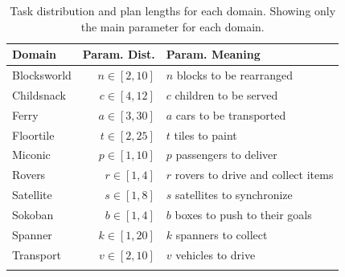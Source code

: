 \documentclass{article}
\begin{document}
\begin{table}[t!]
\centering
\begin{tabular}{lrl}
\toprule
\textbf{Domain} & \textbf{Param. Dist.} & \textbf{Param. Meaning}               \\ \midrule
Blocksworld     & $n \in [2,10]$        & $n$ blocks to be rearranged           \\
Childsnack      & $c \in [4,12]$        & $c$ children to be served             \\
Ferry           & $a \in [3,30]$        & $a$ cars to be transported            \\
Floortile       & $t \in [2,25]$        & $t$ tiles to paint                    \\
Miconic         & $p \in [1, 10]$       & $p$ passengers to deliver             \\
Rovers          & $r \in [1,4]$         & $r$ rovers to drive and collect items \\
Satellite       & $s \in [1,8]$         & $s$ satellites to synchronize         \\
Sokoban         & $b \in [1,4]$         & $b$ boxes to push to their goals      \\
Spanner         & $k \in [1,20]$        & $k$ spanners to collect               \\
Transport       & $v \in [2,10]$        & $v$ vehicles to drive                 \\
\bottomrule \\
\end{tabular}
\caption{Task distribution and plan lengths for each domain. Showing only the
  main parameter for each domain.}
\label{tab:domain-params-small-exp}
\end{table}





\end{document}
